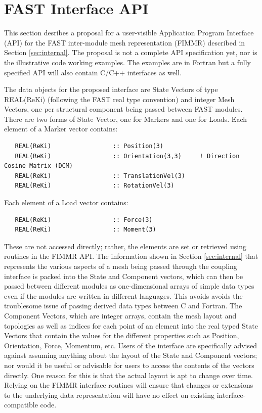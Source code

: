 \documentclass[11pt]{article}
\begin{document}
\section{FAST Interface API}
\label{sec:api}
This section desribes a proposal for a user-visible Application Program Interface (API) for the
FAST inter-module mesh representation (FIMMR) described in Section \ref{sec:internal}. The proposal
is not a complete API specification yet, nor is the illustrative code working examples.  The examples
are in Fortran but a fully specified API will also contain C/C++ interfaces as well.

The data objects for the proposed interface are State Vectors of type REAL(ReKi) (following the
FAST real type convention) and integer Mesh Vectors, one per structural component being passed 
between FAST modules. There are two forms of State Vector, one for Markers and one for Loads.  Each
element of a Marker vector contains:

\begin{verbatim}
   REAL(ReKi)                 :: Position(3)
   REAL(ReKi)                 :: Orientation(3,3)     ! Direction Cosine Matrix (DCM)
   REAL(ReKi)                 :: TranslationVel(3)
   REAL(ReKi)                 :: RotationVel(3)
\end{verbatim}

Each element of a Load vector contains:

\begin{verbatim}
   REAL(ReKi)                 :: Force(3)
   REAL(ReKi)                 :: Moment(3)
\end{verbatim}

These are not accessed directly; rather, the elements are set or retrieved using routines in the 
FIMMR API.  The information shown in Section \ref{sec:internal} that represents the various aspects of
a mesh being passed through the coupling interface is packed into the State and Component vectors, which
can then be passed between different modules as one-dimensional arrays of simple data types even if the modules
are written in different languages.  This avoids avoids the troublesome issue of passing derived data types between
C and Fortran.  The Component Vectors, which are integer arrays, contain the mesh layout and topologies as well
as indices for each point of an element into the real typed State Vectors that contain the values for the 
different properties such as Position, Orientation, Force, Momentum, etc.  Users of the interface are specifically
advised against assuming anything about the layout of the State and Component vectors; nor would it be useful
or advisable for users to access the contents of the vectors directly.  One reason for this is that the 
actual layout is apt to change over time.  Relying on the FIMMR interface routines will ensure that 
changes or extensions to the underlying data representation will have no effect on existing
interface-compatible code.
\end{document}
